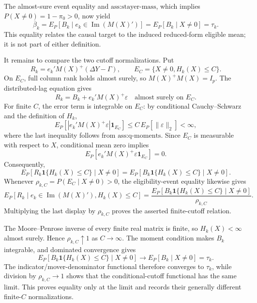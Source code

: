 The almost-sure event equality and \(\text{ass:stayer-mass}\), which implies \(P(X\ne0)=1-\pi_0>0\), now yield
\[
 \overline{\beta}_k
 =E_P[B_k\mid e_k\in\operatorname{Im}(M(X)')]
 =E_P[B_k\mid X\ne0]
 =\tau_k.
\]
This equality relates the causal target to the induced reduced-form eligible mean; it is not part of either definition.

It remains to compare the two cutoff normalizations. Put
\[
 R_k=e_k'M(X)^+(\Delta Y-\Gamma),
 \qquad
 E_C=\{X\ne0,H_k(X)\le C\}.
\]
On \(E_C\), full column rank holds almost surely, so \(M(X)^+M(X)=I_p\). The distributed-lag equation gives
\[
 R_k=B_k+e_k'M(X)^+\varepsilon
 \quad\text{almost surely on }E_C.
\]
For finite \(C\), the error term is integrable on \(E_C\): by conditional Cauchy--Schwarz and the definition of \(H_k\),
\[
 E_P\!\left[|e_k'M(X)^+\varepsilon|\mathbf 1_{E_C}\right]
 \le C\,E_P[\|\varepsilon\|_2]<\infty,
\]
where the last inequality follows from \(\text{ass:q-moments}\). Since \(E_C\) is measurable with respect to \(X\), conditional mean zero implies
\[
 E_P[e_k'M(X)^+\varepsilon\mathbf 1_{E_C}]=0.
\]
Consequently,
\[
 E_P[R_k\mathbf 1\{H_k(X)\le C\}\mid X\ne0]
 =E_P[B_k\mathbf 1\{H_k(X)\le C\}\mid X\ne0].
\]
Whenever \(\rho_{k,C}=P(E_C\mid X\ne0)>0\), the eligibility-event equality likewise gives
\[
 E_P[R_k\mid e_k\in\operatorname{Im}(M(X)'),H_k(X)\le C]
 =\frac{E_P[B_k\mathbf 1\{H_k(X)\le C\}\mid X\ne0]}{\rho_{k,C}}.
\]
Multiplying the last display by \(\rho_{k,C}\) proves the asserted finite-cutoff relation.

The Moore--Penrose inverse of every finite real matrix is finite, so \(H_k(X)<\infty\) almost surely. Hence \(\rho_{k,C}\uparrow1\) as \(C\to\infty\). The moment condition makes \(B_k\) integrable, and dominated convergence gives
\[
 E_P[B_k\mathbf 1\{H_k(X)\le C\}\mid X\ne0]
 \longrightarrow E_P[B_k\mid X\ne0]=\tau_k.
\]
The indicator/mover-denominator functional therefore converges to \(\tau_k\), while division by \(\rho_{k,C}\to1\) shows that the conditional-cutoff functional has the same limit. This proves equality only at the limit and records their generally different finite-\(C\) normalizations.

